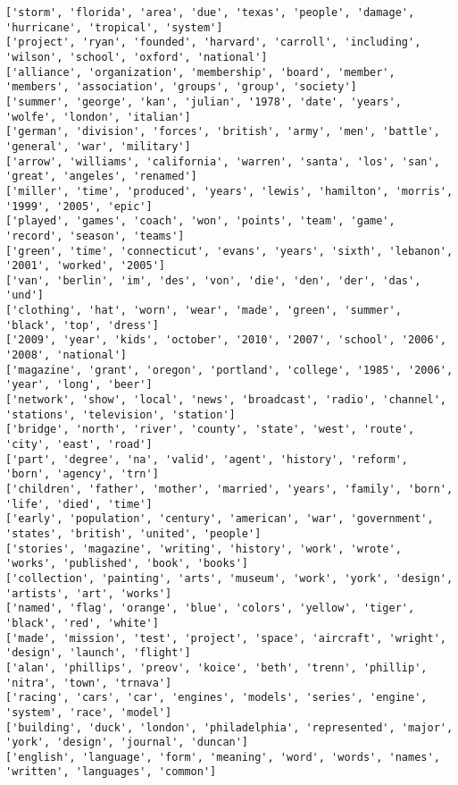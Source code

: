 \documentclass[11pt]{ctexart}
\begin{document}
    \begin{Verbatim}[commandchars=\\\{\}]
['storm', 'florida', 'area', 'due', 'texas', 'people', 'damage', 'hurricane', 'tropical', 'system']
['project', 'ryan', 'founded', 'harvard', 'carroll', 'including', 'wilson', 'school', 'oxford', 'national']
['alliance', 'organization', 'membership', 'board', 'member', 'members', 'association', 'groups', 'group', 'society']
['summer', 'george', 'kan', 'julian', '1978', 'date', 'years', 'wolfe', 'london', 'italian']
['german', 'division', 'forces', 'british', 'army', 'men', 'battle', 'general', 'war', 'military']
['arrow', 'williams', 'california', 'warren', 'santa', 'los', 'san', 'great', 'angeles', 'renamed']
['miller', 'time', 'produced', 'years', 'lewis', 'hamilton', 'morris', '1999', '2005', 'epic']
['played', 'games', 'coach', 'won', 'points', 'team', 'game', 'record', 'season', 'teams']
['green', 'time', 'connecticut', 'evans', 'years', 'sixth', 'lebanon', '2001', 'worked', '2005']
['van', 'berlin', 'im', 'des', 'von', 'die', 'den', 'der', 'das', 'und']
['clothing', 'hat', 'worn', 'wear', 'made', 'green', 'summer', 'black', 'top', 'dress']
['2009', 'year', 'kids', 'october', '2010', '2007', 'school', '2006', '2008', 'national']
['magazine', 'grant', 'oregon', 'portland', 'college', '1985', '2006', 'year', 'long', 'beer']
['network', 'show', 'local', 'news', 'broadcast', 'radio', 'channel', 'stations', 'television', 'station']
['bridge', 'north', 'river', 'county', 'state', 'west', 'route', 'city', 'east', 'road']
['part', 'degree', 'na', 'valid', 'agent', 'history', 'reform', 'born', 'agency', 'trn']
['children', 'father', 'mother', 'married', 'years', 'family', 'born', 'life', 'died', 'time']
['early', 'population', 'century', 'american', 'war', 'government', 'states', 'british', 'united', 'people']
['stories', 'magazine', 'writing', 'history', 'work', 'wrote', 'works', 'published', 'book', 'books']
['collection', 'painting', 'arts', 'museum', 'work', 'york', 'design', 'artists', 'art', 'works']
['named', 'flag', 'orange', 'blue', 'colors', 'yellow', 'tiger', 'black', 'red', 'white']
['made', 'mission', 'test', 'project', 'space', 'aircraft', 'wright', 'design', 'launch', 'flight']
['alan', 'phillips', 'preov', 'koice', 'beth', 'trenn', 'phillip', 'nitra', 'town', 'trnava']
['racing', 'cars', 'car', 'engines', 'models', 'series', 'engine', 'system', 'race', 'model']
['building', 'duck', 'london', 'philadelphia', 'represented', 'major', 'york', 'design', 'journal', 'duncan']
['english', 'language', 'form', 'meaning', 'word', 'words', 'names', 'written', 'languages', 'common']

\end{Verbatim}
\end{document}
